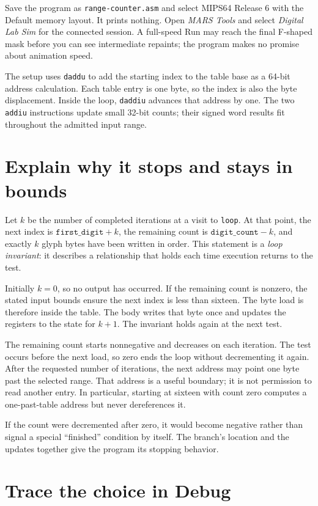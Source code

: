 Save the program as \texttt{range-counter.asm} and select MIPS64 Release 6 with
the Default memory layout. It prints nothing. Open \emph{MARS Tools} and select
\emph{Digital Lab Sim} for the connected session. A full-speed Run may reach the
final F-shaped mask before you can see intermediate repaints; the program makes
no promise about animation speed.

The setup uses \texttt{daddu} to add the starting index to the table base as a
64-bit address calculation. Each table entry is one byte, so the index is also
the byte displacement. Inside the loop, \texttt{daddiu} advances that address by
one. The two \texttt{addiu} instructions update small 32-bit counts; their signed
word results fit throughout the admitted input range.

\section{Explain why it stops and stays in bounds}

Let $k$ be the number of completed iterations at a visit to \texttt{loop}.
At that point, the next index is $\texttt{first\_digit}+k$, the remaining count
is $\texttt{digit\_count}-k$, and exactly $k$ glyph bytes have been written in
order. This statement is a \emph{loop invariant}: it describes a relationship
that holds each time execution returns to the test.

Initially $k=0$, so no output has occurred. If the remaining count is nonzero,
the stated input bounds ensure the next index is less than sixteen. The byte
load is therefore inside the table. The body writes that byte once and updates
the registers to the state for $k+1$. The invariant holds again at the next test.

The remaining count starts nonnegative and decreases on each iteration. The
test occurs before the next load, so zero ends the loop without decrementing it
again. After the requested number of iterations, the next address may point one
byte past the selected range. That address is a useful boundary; it is not
permission to read another entry. In particular, starting at sixteen with count
zero computes a one-past-table address but never dereferences it.

If the count were decremented after zero, it would become negative rather than
signal a special ``finished'' condition by itself. The branch's location and the
updates together give the program its stopping behavior.

\section{Trace the choice in Debug}

